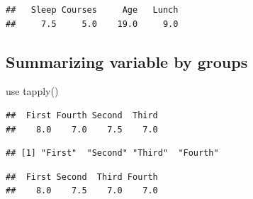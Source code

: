 \documentclass[
  openany]{book}
\newenvironment{Shaded}{\begin{snugshade}}{\end{snugshade}}
\newcommand{\AttributeTok}[1]{\textcolor[rgb]{0.13,0.29,0.53}{#1}}
\newcommand{\FunctionTok}[1]{\textcolor[rgb]{0.13,0.29,0.53}{\textbf{#1}}}
\newcommand{\NormalTok}[1]{#1}
\newcommand{\OtherTok}[1]{\textcolor[rgb]{0.56,0.35,0.01}{#1}}
\newcommand{\SpecialCharTok}[1]{\textcolor[rgb]{0.81,0.36,0.00}{\textbf{#1}}}
\newcommand{\StringTok}[1]{\textcolor[rgb]{0.31,0.60,0.02}{#1}}
\begin{document}
\begin{verbatim}
##   Sleep Courses     Age   Lunch 
##     7.5     5.0    19.0     9.0
\end{verbatim}

\subsection{\texorpdfstring{\textbf{Summarizing variable by groups}}{Summarizing variable by groups}}\label{summarizing-variable-by-groups}

use tapply()

\begin{Shaded}
\end{Shaded}

\begin{verbatim}
##  First Fourth Second  Third 
##    8.0    7.0    7.5    7.0
\end{verbatim}

\begin{Shaded}
\end{Shaded}

\begin{verbatim}
## [1] "First"  "Second" "Third"  "Fourth"
\end{verbatim}

\begin{Shaded}
\end{Shaded}

\begin{verbatim}
##  First Second  Third Fourth 
##    8.0    7.5    7.0    7.0
\end{verbatim}
\end{document}
